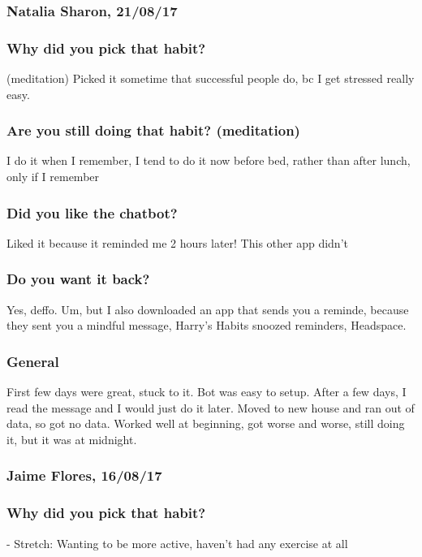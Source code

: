 \documentclass{scaffold/sigchi}
\begin{document}
\subsubsection{Natalia Sharon, 21/08/17}


\subsubsection{Why did you pick that habit?} (meditation)
Picked it sometime that successful people do, bc I get stressed really easy.

\subsubsection{Are you still doing that habit? (meditation)}
I do it when I remember, I tend to do it now before bed, rather than after lunch, only if I remember

\subsubsection{Did you like the chatbot?}
Liked it because it reminded me 2 hours later! This other app didn't

\subsubsection{Do you want it back?}
Yes, deffo. Um, but I also downloaded an app that sends you a reminde, because they sent you a mindful message, Harry's Habits snoozed reminders, Headspace.

\subsubsection{General}
First few days were great, stuck to it. Bot was easy to setup. After a few days, I read the message and I would just do it later. Moved to new house and ran out of data, so got no data.
Worked well at beginning, got worse and worse, still doing it, but it was at midnight.

\subsubsection{Jaime Flores, 16/08/17}

\subsubsection{Why did you pick that habit?}
- Stretch:
Wanting to be more active, haven't had any exercise at all
\end{document}
